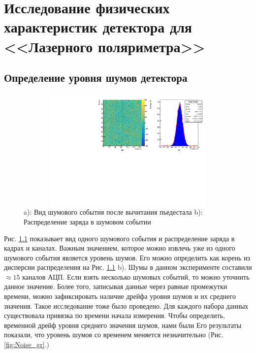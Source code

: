 \chapter{Исследование физических характеристик детектора для <<Лазерного поляриметра>>}
\section{Определение уровня шумов детектора}
\label{sec:noise_study}
\begin{figure}[H]
	\begin{center}
		\includegraphics[width = 12cm, height = 6cm]{img/noise_map.pdf}
		\caption{a): Вид шумового события после вычитания пьедестала b): Распределение заряда в шумовом событии}
		\label{noise_map}
	\end{center}
\end{figure}
Рис. \ref{noise_map} показывает вид одного шумового события и распределение заряда в кадрах и каналах. Важным значением, которое можно извлечь уже из одного шумового события является уровень шумов. Его можно определить как корень из дисперсии распределения на Рис. \ref{noise_map} b). Шумы в данном эксперименте составили $\approx15$ каналов АЦП. Если взять несколько шумовых событий, то можно уточнить данное значение. Более того, записывая данные через равные промежутки времени, можно зафиксировать наличие дрейфа уровня шумов и их среднего значения. Такое исследование тоже было проведено. Для каждого набора данных существовала привязка по времени начала измерения. Чтобы определить, временной дрейф уровня среднего значения шумов, нами были Его результаты показали, что уровень шумов со временем меняется незначительно (Рис.\ref{fig:Noise_gr}.)

